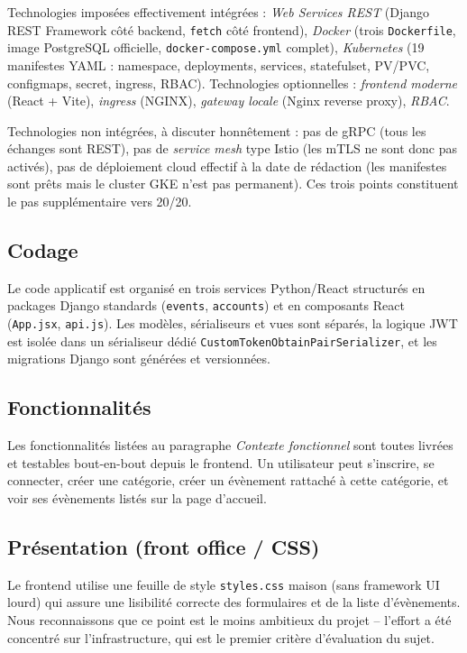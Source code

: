 \documentclass[11pt,a4paper]{article}
\newcommand{\code}[1]{\texttt{#1}}
\begin{document}
Technologies imposées effectivement intégrées : \emph{Web Services REST} (Django REST Framework côté backend, \code{fetch} côté frontend), \emph{Docker} (trois \code{Dockerfile}, image PostgreSQL officielle, \code{docker-compose.yml} complet), \emph{Kubernetes} (19 manifestes YAML : namespace, deployments, services, statefulset, PV/PVC, configmaps, secret, ingress, RBAC). Technologies optionnelles : \emph{frontend moderne} (React + Vite), \emph{ingress} (NGINX), \emph{gateway locale} (Nginx reverse proxy), \emph{RBAC}.

Technologies non intégrées, à discuter honnêtement : pas de gRPC (tous les échanges sont REST), pas de \emph{service mesh} type Istio (les mTLS ne sont donc pas activés), pas de déploiement cloud effectif à la date de rédaction (les manifestes sont prêts mais le cluster GKE n'est pas permanent). Ces trois points constituent le pas supplémentaire vers 20/20.

\subsection{Codage}

Le code applicatif est organisé en trois services Python/React structurés en packages Django standards (\code{events}, \code{accounts}) et en composants React (\code{App.jsx}, \code{api.js}). Les modèles, sérialiseurs et vues sont séparés, la logique JWT est isolée dans un sérialiseur dédié \code{CustomTokenObtainPairSerializer}, et les migrations Django sont générées et versionnées.

\subsection{Fonctionnalités}

Les fonctionnalités listées au paragraphe \emph{Contexte fonctionnel} sont toutes livrées et testables bout-en-bout depuis le frontend. Un utilisateur peut s'inscrire, se connecter, créer une catégorie, créer un évènement rattaché à cette catégorie, et voir ses évènements listés sur la page d'accueil.

\subsection{Présentation (front office / CSS)}

Le frontend utilise une feuille de style \code{styles.css} maison (sans framework UI lourd) qui assure une lisibilité correcte des formulaires et de la liste d'évènements. Nous reconnaissons que ce point est le moins ambitieux du projet -- l'effort a été concentré sur l'infrastructure, qui est le premier critère d'évaluation du sujet.
\end{document}
